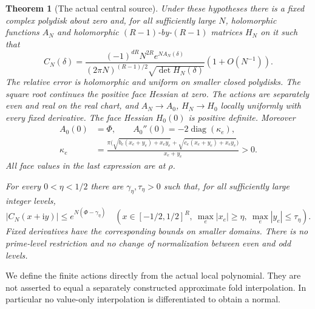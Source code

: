 \documentclass[11pt]{article}
\numberwithin{equation}{section}
\newtheorem{theorem}{Theorem}[section]
\theoremstyle{definition}\newtheorem{definition}[theorem]{Definition}
\theoremstyle{remark}\newtheorem{remark}[theorem]{Remark}
\newcommand{\ii}{\mathrm i}
\begin{document}
\begin{theorem}[The actual central source]\label{sa:main}
Under these hypotheses there is a fixed complex polydisk about zero
and, for all sufficiently large $N$, holomorphic functions $A_N$ and
holomorphic $(R-1)$-by-$(R-1)$ matrices $H_N$ on it such that
\begin{equation}\label{sa:H1}
 C_N(\delta)=
 \frac{(-1)^{dR}N^{2R}e^{NA_N(\delta)}}
 {(2\pi N)^{(R-1)/2}\sqrt{\det H_N(\delta)}}
                         (1+O(N^{-1})).
\end{equation}
The relative error is holomorphic and uniform on smaller closed
polydisks. The square root continues the positive face Hessian at zero.
The actions are separately even and real on the real chart, and
$A_N\to A_0$, $H_N\to H_0$ locally uniformly with every fixed derivative.
The face Hessian $H_0(0)$ is positive definite. Moreover
\begin{equation}\label{sa:hessian}
 \begin{aligned}
 A_0(0)&=\Phi,\qquad A_0''(0)=-2\operatorname{diag}(\kappa_e),\\
 \kappa_e&=\frac{\pi\bigl(\sqrt{b_e(x_e+y_e)+x_ey_e}
                    +\sqrt{c_e(x_e+y_e)+x_ey_e}\bigr)}
                    {x_e+y_e}>0.
 \end{aligned}
\end{equation}
All face values in the last expression are at $\rho$.

For every $0<\eta<1/2$ there are $\gamma_\eta,\tau_\eta>0$ such that,
for all sufficiently large integer levels,
\begin{equation}\label{sa:H2}
 |C_N(x+\ii y)|\le e^{N(\Phi-\gamma_\eta)}
 \quad(x\in[-1/2,1/2]^R,\ \max_e|x_e|\ge\eta,
                       \ \max_e|y_e|\le\tau_\eta).
\end{equation}
Fixed derivatives have the corresponding bounds on smaller domains.
There is no prime-level restriction and no change of normalization
between even and odd levels.
\end{theorem}

We define the finite actions directly from the actual local polynomial.
They are not asserted to equal a separately constructed approximate
fold interpolation. In particular no value-only interpolation is
differentiated to obtain a normal.
\end{document}
